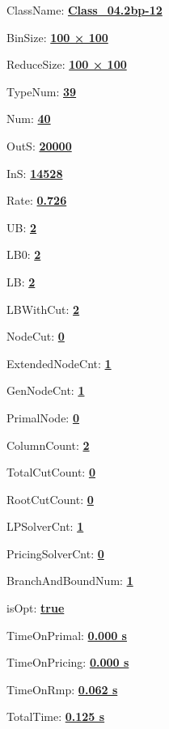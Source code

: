 \documentclass[11pt]{article}
\begin{document}
\pagestyle{empty}


ClassName: \underline{\textbf{Class_04.2bp-12}}
\par
BinSize: \underline{\textbf{100 × 100}}
\par
ReduceSize: \underline{\textbf{100 × 100}}
\par
TypeNum: \underline{\textbf{39}}
\par
Num: \underline{\textbf{40}}
\par
OutS: \underline{\textbf{20000}}
\par
InS: \underline{\textbf{14528}}
\par
Rate: \underline{\textbf{0.726}}
\par
UB: \underline{\textbf{2}}
\par
LB0: \underline{\textbf{2}}
\par
LB: \underline{\textbf{2}}
\par
LBWithCut: \underline{\textbf{2}}
\par
NodeCut: \underline{\textbf{0}}
\par
ExtendedNodeCnt: \underline{\textbf{1}}
\par
GenNodeCnt: \underline{\textbf{1}}
\par
PrimalNode: \underline{\textbf{0}}
\par
ColumnCount: \underline{\textbf{2}}
\par
TotalCutCount: \underline{\textbf{0}}
\par
RootCutCount: \underline{\textbf{0}}
\par
LPSolverCnt: \underline{\textbf{1}}
\par
PricingSolverCnt: \underline{\textbf{0}}
\par
BranchAndBoundNum: \underline{\textbf{1}}
\par
isOpt: \underline{\textbf{true}}
\par
TimeOnPrimal: \underline{\textbf{0.000 s}}
\par
TimeOnPricing: \underline{\textbf{0.000 s}}
\par
TimeOnRmp: \underline{\textbf{0.062 s}}
\par
TotalTime: \underline{\textbf{0.125 s}}
\par
\newpage
\end{document}
